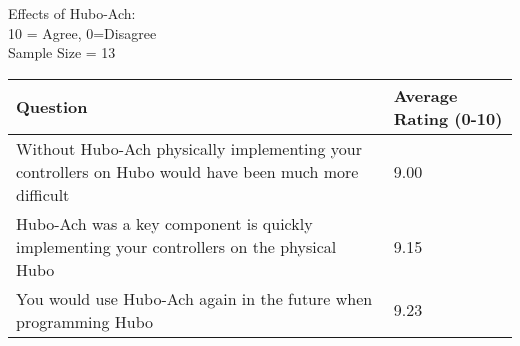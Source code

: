 \begin{table}
\centering
\caption{Q6: Survey on the Unified Algorithmic Framework for Complex System and Humanoids, Hubo-Ach:}\label{table:q6}
Effects of Hubo-Ach:\\
\small
10 = Agree, 0=Disagree\\
Sample Size = 13\\
\normalsize
\begin{longtable}{|p{9cm} | p{3cm} | }
\hline
Question		&	Average Rating (0-10)	\\	\hline
\hline
\hline
Without Hubo-Ach physically implementing your controllers on Hubo would have been much more difficult	& 	9.00 \\
\hline
Hubo-Ach was a key component is quickly implementing your controllers on the physical Hubo		&	9.15 \\
\hline
You would use Hubo-Ach again in the future when programming Hubo					& 	9.23 \\
\hline

\end{longtable}
\end{table}

